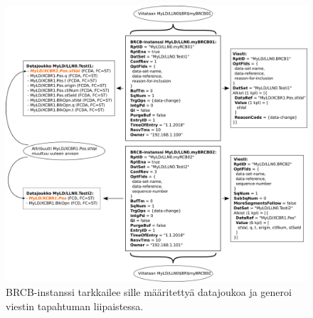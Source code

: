 \begin{figure}[ht!]
	\includegraphics[width=1\textwidth]{pictures/iec61850-data-set-reporting.png}
	\caption{BRCB-instanssi tarkkailee sille määritettyä datajoukoa ja generoi viestin tapahtuman liipaistessa.}
	\label{fig:iec61850-data-set-reporting}
\end{figure}

